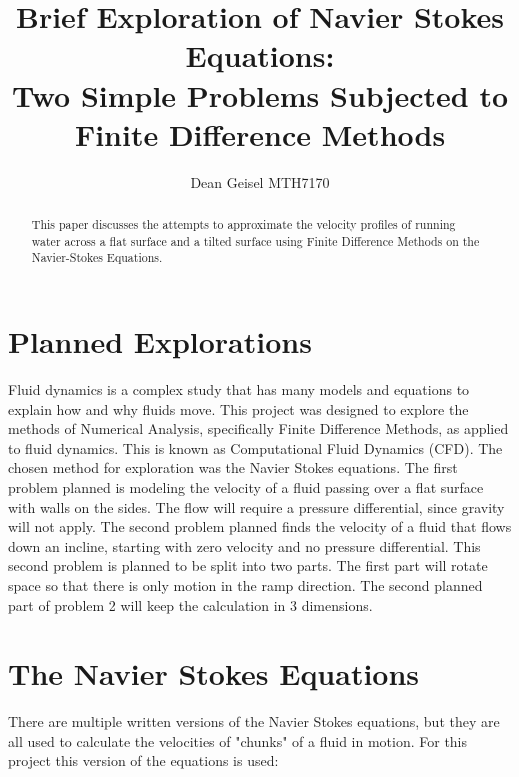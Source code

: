 \documentclass{article}
\title{Brief Exploration of Navier Stokes Equations:\\Two Simple Problems Subjected to Finite Difference Methods
}
\author{Dean Geisel MTH7170}
\begin{document}
	\maketitle
	\begin{abstract}
		This paper discusses the attempts to approximate the velocity profiles of running water across a flat surface and a tilted surface using Finite Difference Methods on the Navier-Stokes Equations.
	\end{abstract}	

	\section{Planned Explorations}
	\label{sec: Planned Explorations}
	Fluid dynamics is a complex study that has many models and equations to explain how and why fluids move. This project was designed to explore the methods of Numerical Analysis, specifically Finite Difference Methods, as applied to fluid dynamics. This is known as Computational Fluid Dynamics (CFD). The chosen method for exploration was the Navier Stokes equations. The first problem planned is modeling the velocity of a fluid passing over a flat surface with walls on the sides. The flow will require a pressure differential, since gravity will not apply. The second problem planned finds the velocity of a fluid that flows down an incline, starting with zero velocity and no pressure differential. This second problem is planned to be split into two parts. The first part will rotate space so that there is only motion in the ramp direction. The second planned part of problem 2 will keep the calculation in 3 dimensions.
		\section{The Navier Stokes Equations}
	\label{sec: The Navier Stokes Equations}
	There are multiple written versions of the Navier Stokes equations, but they are all used to calculate the velocities of "chunks" of a fluid in motion. For this project this version of the equations is used:
	
\end{document}
